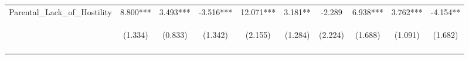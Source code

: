 \begin{tabular}{lccccccccc}
\noalign{\smallskip}Parental_Lack_of_Hostility & 8.800*** & 3.493*** & -3.516*** & 12.071*** & 3.181** & -2.289 & 6.938*** & 3.762*** & -4.154**\\
 & \begin{footnotesize}(1.334)\end{footnotesize} & \begin{footnotesize}(0.833)\end{footnotesize} & \begin{footnotesize}(1.342)\end{footnotesize} & \begin{footnotesize}(2.155)\end{footnotesize} & \begin{footnotesize}(1.284)\end{footnotesize} & \begin{footnotesize}(2.224)\end{footnotesize} & \begin{footnotesize}(1.688)\end{footnotesize} & \begin{footnotesize}(1.091)\end{footnotesize} & \begin{footnotesize}(1.682)\end{footnotesize}\\
\noalign{\smallskip}\hline\end{tabular}\\
